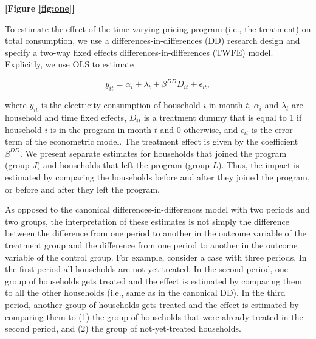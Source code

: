 \documentclass[12pt]{article}
\begin{document}
\centerline{\textbf{[Figure \ref{fig:one}]}}


To estimate the effect of the time-varying pricing program (i.e., the treatment) on total consumption, we use a differences-in-differences (DD) research design and specify a two-way fixed effects differences-in-differences (TWFE) model. Explicitly, we use OLS to estimate

\begin{equation}
	y_{it} = \alpha_{i} + \lambda_{t} + \beta^{DD} D_{it} + \epsilon_{it},
\end{equation}

where $y_{it}$ is the electricity consumption of household $i$ in month $t$, $\alpha_{i}$ and $\lambda_{t}$ are household and time fixed effects, $D_{it}$ is a treatment dummy that is equal to 1 if household $i$ is in the program in month $t$ and 0 otherwise, and $\epsilon _{it}$ is the error term of the econometric model. The treatment effect is given by the coefficient $\beta^{DD}$. We present separate estimates for households that joined the program (group $J$) and households that left the program (group $L$). Thus, the impact is estimated by comparing the households before and after they joined the program, or before and after they left the program.

As opposed to the canonical differences-in-differences model with two periods and two groups, the interpretation of these estimates is not simply the difference between the difference from one period to another in the outcome variable of the treatment group and the difference from one period to another in the outcome variable of the control group. For example, consider a case with three periods. In the first period all households are not yet treated. In the second period, one group of households gets treated and the effect is estimated by comparing them to all the other households (i.e., same as in the canonical DD). In the third period, another group of households gets treated and the effect is estimated by comparing them to (1) the group of households that were already treated in the second period, and (2) the group of not-yet-treated households.
\end{document}
